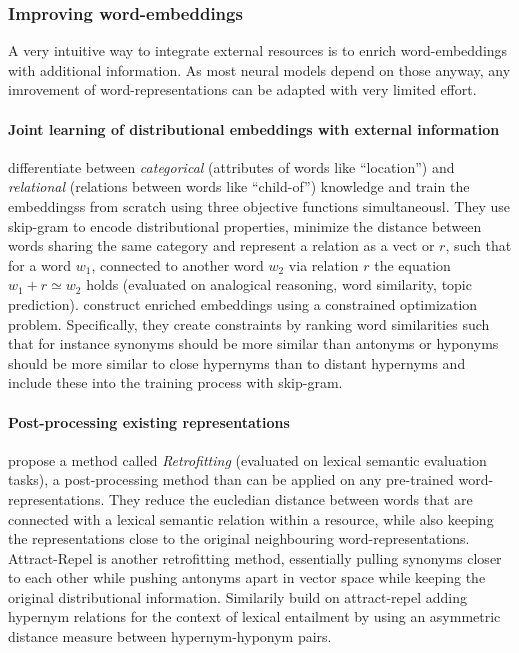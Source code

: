 \subsubsection{Improving word-embeddings}\label{sec:embeddings_improvements_relwork}
A very intuitive way to integrate external resources is to enrich word-embeddings with additional information. As most neural models depend on those anyway, any imrovement of word-representations can be adapted with very limited effort.

\paragraph*{Joint learning of distributional embeddings with external information}
\cite{xu2014rc} differentiate between \textit{categorical} (attributes of words like ``location'') and \textit{relational} (relations between words like ``child-of'') knowledge and train the embeddingss from scratch using three objective functions simultaneousl. They use skip-gram to encode distributional properties, minimize the distance between words sharing the same category and represent a relation as a vect or $r$, such that for a word $w_1$, connected to another word $w_2$ via relation $r$ the equation $w_1 + r \simeq w_2$ holds (evaluated on analogical reasoning, word similarity, topic prediction). \cite{liu2015learning} construct enriched embeddings using a constrained optimization problem. Specifically, they create constraints by ranking word similarities such that for instance synonyms should be more similar than antonyms or hyponyms should be more similar to close hypernyms than to distant hypernyms and include these into the training process with skip-gram. 
\paragraph*{Post-processing existing representations}
 \cite{faruqui2015retrofitting} propose a method called \textit{Retrofitting} (evaluated on lexical semantic evaluation tasks), a post-processing method than can be applied on any pre-trained word-representations. They reduce the eucledian distance between words that are connected with a lexical semantic relation within a resource, while also keeping the representations close to the original neighbouring word-representations. Attract-Repel \citep{mrkvsic2017semantic} is another retrofitting method, essentially pulling synonyms closer to each other while pushing antonyms apart in vector space while keeping the original distributional information. Similarily \cite{vulic2017specialising} build on attract-repel adding hypernym relations for the context of lexical entailment by using an asymmetric distance measure between hypernym-hyponym pairs.
 
